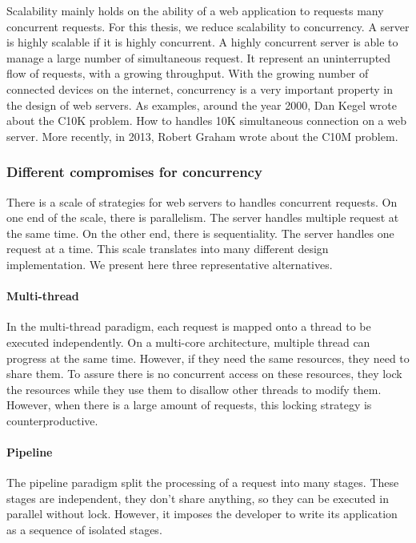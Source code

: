 Scalability mainly holds on the ability of a web application to requests many concurrent requests.
For this thesis, we reduce scalability to concurrency.
A server is highly scalable if it is highly concurrent.
A highly concurrent server is able to manage a large number of simultaneous request.
It represent an uninterrupted flow of requests, with a growing throughput.
With the growing number of connected devices on the internet, concurrency is a very important property in the design of web servers.
As examples, around the year 2000, Dan Kegel wrote about the C10K problem.
How to handles 10K simultaneous connection on a web server.
More recently, in 2013, Robert Graham wrote about the C10M problem.

\subsubsection{Different compromises for concurrency}

There is a scale of strategies for web servers to handles concurrent requests.
On one end of the scale, there is parallelism.
The server handles multiple request at the same time.
On the other end, there is sequentiality.
The server handles one request at a time.
This scale translates into many different design implementation.
We present here three representative alternatives.

\paragraph{Multi-thread} %

In the multi-thread paradigm, each request is mapped onto a thread to be executed independently.
On a multi-core architecture, multiple thread can progress at the same time.
However, if they need the same resources, they need to share them.
To assure there is no concurrent access on these resources, they lock the resources while they use them to disallow other threads to modify them.
However, when there is a large amount of requests, this locking strategy is counterproductive.

\paragraph{Pipeline} %

The pipeline paradigm split the processing of a request into many stages.
These stages are independent, they don't share anything, so they can be executed in parallel without lock.
However, it imposes the developer to write its application as a sequence of isolated stages.

